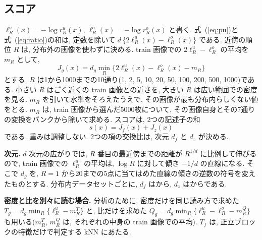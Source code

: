 \documentclass[MIRU,submit]{miru2025j}
\renewcommand{\eqref}[1]{(\ref{#1})}
\begin{document}
\subsection{スコア}
\label{sec:score}
$\ell^{u}_{R}(x)=-\log r^{u}_{R}(x)$, $\ell^{o}_{R}(x)=-\log r^{o}_{R}(x)$ と書く. 式~\eqref{eq:pu}と式~\eqref{eq:ratio}の和は, 定数を除いて $d\,\{2\ell^{u}_{R}(x)-\ell^{o}_{R}(x)\}$ である. 近傍の順位 $R$ は, 分布外の画像を使わずに決める. train 画像での $2\ell^{u}_{R}-\ell^{o}_{R}$ の平均を $m_R$ として,
\begin{equation}
J_g(x)=d_g\min_{R}\bigl\{2\ell^{u}_{R}(x)-\ell^{o}_{R}(x)-m_R\bigr\}
\label{eq:J}
\end{equation}
とする. $R$ は1から1000までの10通り(1, 2, 5, 10, 20, 50, 100, 200, 500, 1000)である. 小さい $R$ はごく近くの train 画像との近さを, 大きい $R$ は広い範囲での密度を見る. $m_R$ を引いて水準をそろえたうえで, その画像が最も分布内らしくない値をとる. $m_R$ は, train 画像から選んだ5000枚について, その画像自身とその7通りの変換をバンクから除いて求める. スコアは, 2つの記述子の和
\begin{equation}
s(x)=J_f(x)+J_z(x)
\label{eq:score}
\end{equation}
である. 重みは調整しない. 2つの項の交換比は, 次元 $d_f$ と $d_z$ が決める.

\textbf{次元.} $d$ 次元の広がりでは, $R$ 番目の最近傍までの距離が $R^{1/d}$ に比例して伸びるので, train 画像での $\ell^{u}_{R}$ の平均は, $\log R$ に対して傾き $-1/d$ の直線になる. そこで $d_g$ を, $R=1$ から20までの5点に当てはめた直線の傾きの逆数の符号を変えたものとする. 分布内データセットごとに, $d_f$ は\nDimFMin{}から\nDimFMax, $d_z$ は\nDimZMin{}から\nDimZMax{}である.

\textbf{密度と比を別々に読む場合.} 分析のために, 密度だけを同じ読み方で求めた $T_g=d_g\min_R\{\ell^{u}_{R}-m^{T}_{R}\}$ と, 比だけを求めた $Q_g=d_g\min_R\{\ell^{u}_{R}-\ell^{o}_{R}-m^{Q}_{R}\}$ も用いる($m^{T}_{R}$, $m^{Q}_{R}$ は, それぞれの中身の train 画像での平均). $T_f$ は, 正立ブロックの特徴だけで判定する kNN にあたる.
\end{document}
